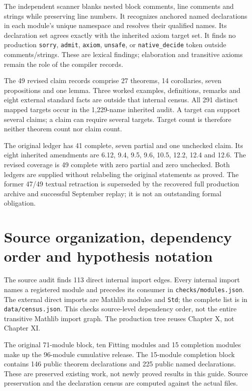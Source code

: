 \documentclass[11pt]{article}
\newcommand{\code}[1]{\nolinkurl{#1}}
\begin{document}
The independent scanner blanks nested block comments, line comments and strings while preserving line numbers. It recognizes anchored named declarations in each module's unique namespace and resolves their qualified names. Its declaration set agrees exactly with the inherited axiom target set. It finds no production \code{sorry}, \code{admit}, \code{axiom}, \code{unsafe}, or \code{native_decide} token outside comments/strings. These are lexical findings; elaboration and transitive axioms remain the role of the compiler records.

The 49 revised claim records comprise 27 theorems, 14 corollaries, seven propositions and one lemma. Three worked examples, definitions, remarks and eight external standard facts are outside that internal census. All 291 distinct mapped targets occur in the 1,229-name inherited audit. A target can support several claims; a claim can require several targets. Target count is therefore neither theorem count nor claim count.

The original ledger has 41 complete, seven partial and one unchecked claim. Its eight inherited amendments are 6.12, 9.4, 9.5, 9.6, 10.5, 12.2, 12.4 and 12.6. The revised coverage is 49 complete with zero partial and zero unchecked. Both ledgers are supplied without relabeling the original statements as proved. The former 47/49 textual retraction is superseded by the recovered full production archive and successful September replay; it is not an outstanding formal obligation.

\section{Source organization, dependency order and hypothesis notation}
The source audit finds 113 direct internal import edges. Every internal import names a registered module and precedes its consumer in \code{checks/modules.json}. The external direct imports are Mathlib modules and \code{Std}; the complete list is in \code{data/census.json}. This checks source-level dependency order, not the entire transitive Mathlib import graph. The production tree reuses Chapter X, not Chapter XI.

The original 71-module block, ten Fitting modules and 15 completion modules make up the 96-module cumulative release. The 15-module completion block contains 146 public theorem declarations and 225 public named declarations. These are preserved existing work, not newly proved results in this guide. Source preservation and the declaration census are computed against the actual files.
\end{document}
